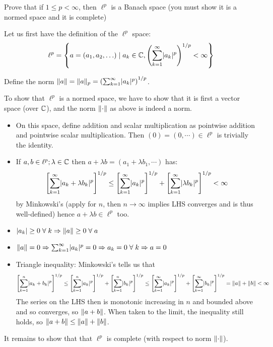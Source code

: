 \documentclass[a4paper, 10pt]{article}
\begin{document}
\begin{problem} [\done]
    Prove that if $1 \leq p < \infty$, then $\ell^p$ is a Banach space (you must show it is a normed space and it is complete)
\end{problem}
\begin{solution}
    Let us first have the definition of the $\ell^p$ space: \begin{equation*}
    \ell^p = \left\{a = (a_1, a_2, \ldots) \mid a_k \in \mathbb{C}, \left(\sum_{k=1}^{\infty} \lvert a_k\rvert^p\right)^{1/p} < \infty\right\}
    \end{equation*}

    Define the norm $\lVert a\rVert = \lVert a\rVert_p = \left(\sum_{k=1}^{\infty} \lvert a_k\rvert^p\right)^{1/p}$.
    
    To show that $\ell^p$ is a normed space, we have to show that it is first a vector space (over $\mathbb{C}$), and the norm $\lVert\cdot\rVert$ as above is indeed a norm. 
    \begin{itemize}
        \item On this space, define addition and scalar multiplication as pointwise addition and pointwise scalar multiplication. Then $(0) = (0, \cdots) \in \ell^p$ is trivially the identity.
        \item If $a, b \in \ell^p; \lambda \in \mathbb{C}$ then $a + \lambda b = (a_1 + \lambda b_1, \cdots)$ has:
        \begin{equation*}
            \left[\sum_{k=1}^{\infty}\lvert a_k + \lambda b_k\rvert^p\right]^{1/p} \leq \left[\sum_{k=1}^{\infty} \lvert a_k\rvert^p \right]^{1/p} + \left[\sum_{k=1}^{\infty} \lvert\lambda b_k\rvert^p\right]^{1/p} < \infty
        \end{equation*}
        by Minkowski's (apply for $n$, then $n \to \infty$ implies LHS converges  and is thus well-defined) hence $a + \lambda b \in \ell^p$ too.
        \item $\abs{a_k} \geq 0 \forall k \implies \norm{a} \geq 0 \forall a$
        \item $\norm{a} = 0 \implies \sum_{k=1}^{\infty} \abs{a_k}^p = 0 \implies a_k = 0 \forall k \implies a = 0$
        \item Triangle inequality: Minkowski's tells us that \begin{equation*}
        \left[\sum_{k=1}^{n} \lvert a_k + b_k\rvert^p\right]^{1/p} \leq \left[\sum_{k=1}^{n} \lvert a_k\rvert^p\right]^{1/p}  + \left[\sum_{k=1}^{n} \lvert b_k\rvert^p\right]^{1/p} \leq \left[\sum_{k=1}^{\infty} \lvert a_k\rvert^p\right]^{1/p}  + \left[\sum_{k=1}^{\infty} \lvert b_k\rvert^p\right]^{1/p} = \lVert a\rVert + \lVert b\rVert < \infty
        \end{equation*}
        The series on the LHS then is monotonic increasing in $n$ and bounded above and so converges, so $\lVert a + b\rVert$. When taken to the limit, the inequality still holds, so $\lVert a + b\rVert \leq \lVert a\rVert + \lVert b\rVert$. 
    \end{itemize}
    It remains to show that that $\ell^p$ is complete (with respect to norm $\lVert\cdot\rVert$).


\end{solution}
\end{document}
